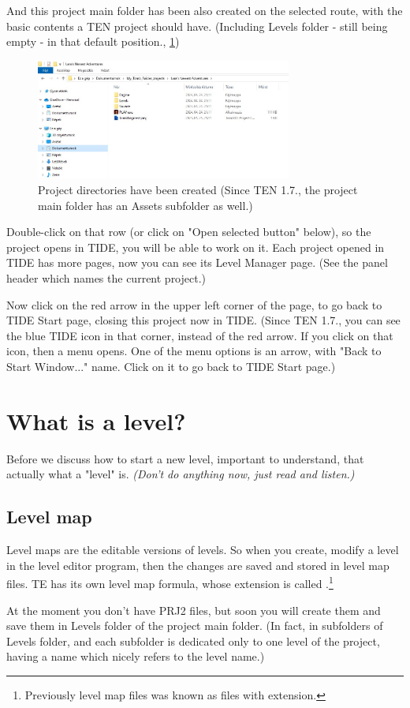 \par And this project main folder has been also created on the selected route, with the basic contents a TEN project should have. (Including Levels folder - still being empty - in that default position., \ref{fig:tide4})

\begin{figure}
    \centering
     \includegraphics[width=0.75\textwidth]{screenshots/4.jpg}
     \caption{Project directories have been created (Since TEN 1.7., the project main folder has an Assets subfolder as well.)}
     \label{fig:tide4}
\end{figure}

Double-click on that row (or click on "Open selected button" below), so the project opens in TIDE, you will be able to work on it. Each project opened in TIDE has more pages, now you can see its Level Manager page. (See the panel header which names the current project.)
\par Now click on the red arrow in the upper left corner of the page, to go back to TIDE Start page, closing this project now in TIDE. (Since TEN 1.7., you can see the blue TIDE icon in that corner, instead of the red arrow. If you click on that icon, then a menu opens. One of the menu options is an arrow, with "Back to Start Window..." name. Click on it to go back to TIDE Start page.) \cite{akyv_tutorial}

\chapter{What is a level?}
Before we discuss how to start a new level, important to understand, that actually what a "level" is.
\emph{(Don't do anything now, just read and listen.)}
\section{Level map}
Level maps are the editable versions of levels. So when you create, modify a level in the level editor program, then the changes are saved and stored in level map files.
 TE has its own level map formula, whose extension is called .\footnote{Previously level map files was known as files with  extension.}
 \par At the moment you don't have PRJ2 files, but soon you will create them and save them in Levels folder of the project main folder. (In fact, in subfolders of Levels folder, and each subfolder is dedicated only to one level of the project, having a name which nicely refers to the level name.)
